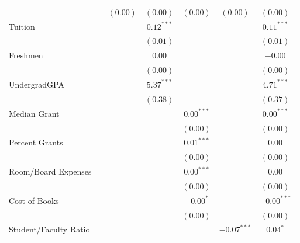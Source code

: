 \begin{table}
\begin{center}
\begin{tabular}{l c c c c c c }
                      &                & $(0.00)$       & $(0.00)$       & $(0.00)$       & $(0.00)$       & $(0.00)$       \\
Tuition               &                &                & $0.12^{***}$   &                &                & $0.11^{***}$   \\
                      &                &                & $(0.01)$       &                &                & $(0.01)$       \\
Freshmen              &                &                & $0.00$         &                &                & $-0.00$        \\
                      &                &                & $(0.00)$       &                &                & $(0.00)$       \\
UndergradGPA          &                &                & $5.37^{***}$   &                &                & $4.71^{***}$   \\
                      &                &                & $(0.38)$       &                &                & $(0.37)$       \\
Median Grant          &                &                &                & $0.00^{***}$   &                & $0.00^{***}$   \\
                      &                &                &                & $(0.00)$       &                & $(0.00)$       \\
Percent Grants        &                &                &                & $0.01^{***}$   &                & $0.00$         \\
                      &                &                &                & $(0.00)$       &                & $(0.00)$       \\
Room/Board Expenses   &                &                &                & $0.00^{***}$   &                & $0.00$         \\
                      &                &                &                & $(0.00)$       &                & $(0.00)$       \\
Cost of Books         &                &                &                & $-0.00^{*}$    &                & $-0.00^{***}$  \\
                      &                &                &                & $(0.00)$       &                & $(0.00)$       \\
Student/Faculty Ratio &                &                &                &                & $-0.07^{***}$  & $0.04^{*}$     \\

\end{tabular}
\end{center}
\end{table}
